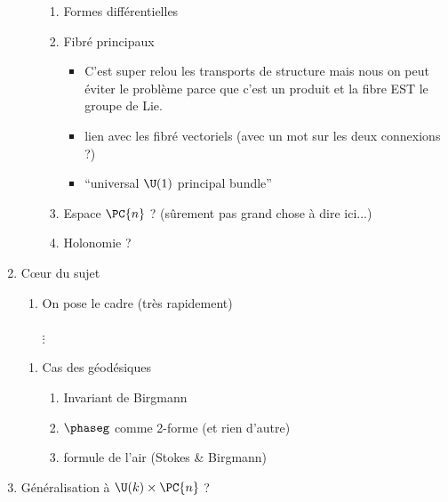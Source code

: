 \begin{enumerate}[label=\Roman* --- ]
\begin{enumerate}[label=\arabic* --- ]
\begin{enumerate}[label=\arabic{enumi}.\arabic* --- ]
			\item Formes différentielles
			
			\item Fibré principaux
			\begin{itemize}
				\item C'est super relou les transports de structure mais nous on peut éviter le problème parce que c'est un produit et la fibre EST le groupe de Lie.
				
				\item lien avec les fibré vectoriels (avec un mot sur les deux connexions ?)
				
				\item ``universal $\U(1)$ principal bundle''
			\end{itemize}
			
			\item Espace $\PC{n}$ ? (sûrement pas grand chose à dire ici...)
			
			\item Holonomie ?
		\end{enumerate}
	\end{enumerate}
		
	\item C\oe ur du sujet
	\begin{enumerate}[label=\arabic* --- ]
		
		\item On pose le cadre (très rapidement)
	\\ \\
	$\vdots$
	\end{enumerate}
		
	\begin{enumerate}[start=14, label=\textit{\alph*} --- ]
		\item Cas des géodésiques 
		
		\begin{enumerate}[label=\textit{n}.\arabic* --- ]
			
			\item Invariant de Birgmann
			
			\item $\phaseg$ comme 2-forme (et rien d'autre)
			
			\item formule de l'air (Stokes \& Birgmann)
		\end{enumerate}
	\end{enumerate}
	
	\item Généralisation à $\U(k)\times \PC{n}$ ?
	
\end{enumerate}



